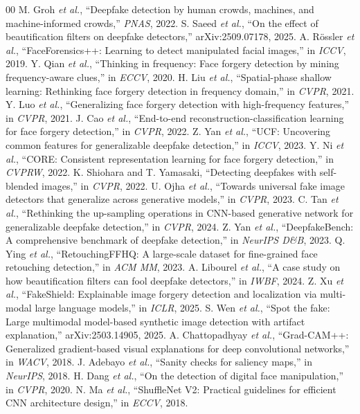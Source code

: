 \documentclass[conference]{IEEEtran}
\begin{document}
\begin{thebibliography}{00}
 M. Groh \emph{et al.}, ``Deepfake detection by human crowds, machines,
and machine-informed crowds,'' \emph{PNAS}, 2022.
 S. Saeed \emph{et al.}, ``On the effect of beautification filters on
deepfake detectors,'' arXiv:2509.07178, 2025.
 A. R\"ossler \emph{et al.}, ``FaceForensics++: Learning to detect
manipulated facial images,'' in \emph{ICCV}, 2019.
 Y. Qian \emph{et al.}, ``Thinking in frequency: Face forgery detection by
mining frequency-aware clues,'' in \emph{ECCV}, 2020.
 H. Liu \emph{et al.}, ``Spatial-phase shallow learning: Rethinking face
forgery detection in frequency domain,'' in \emph{CVPR}, 2021.
 Y. Luo \emph{et al.}, ``Generalizing face forgery detection with
high-frequency features,'' in \emph{CVPR}, 2021.
 J. Cao \emph{et al.}, ``End-to-end reconstruction-classification learning
for face forgery detection,'' in \emph{CVPR}, 2022.
 Z. Yan \emph{et al.}, ``UCF: Uncovering common features for
generalizable deepfake detection,'' in \emph{ICCV}, 2023.
 Y. Ni \emph{et al.}, ``CORE: Consistent representation learning for face
forgery detection,'' in \emph{CVPRW}, 2022.
 K. Shiohara and T. Yamasaki, ``Detecting deepfakes with self-blended
images,'' in \emph{CVPR}, 2022.
 U. Ojha \emph{et al.}, ``Towards universal fake image detectors that
generalize across generative models,'' in \emph{CVPR}, 2023.
 C. Tan \emph{et al.}, ``Rethinking the up-sampling operations in CNN-based
generative network for generalizable deepfake detection,'' in \emph{CVPR}, 2024.
 Z. Yan \emph{et al.}, ``DeepfakeBench: A comprehensive benchmark of
deepfake detection,'' in \emph{NeurIPS D\&B}, 2023.
 Q. Ying \emph{et al.}, ``RetouchingFFHQ: A large-scale dataset for
fine-grained face retouching detection,'' in \emph{ACM MM}, 2023.
 A. Libourel \emph{et al.}, ``A case study on how beautification
filters can fool deepfake detectors,'' in \emph{IWBF}, 2024.
 Z. Xu \emph{et al.}, ``FakeShield: Explainable image forgery detection and
localization via multi-modal large language models,'' in \emph{ICLR}, 2025.
 S. Wen \emph{et al.}, ``Spot the fake: Large multimodal model-based
synthetic image detection with artifact explanation,'' arXiv:2503.14905, 2025.
 A. Chattopadhyay \emph{et al.}, ``Grad-CAM++: Generalized
gradient-based visual explanations for deep convolutional networks,'' in \emph{WACV}, 2018.
 J. Adebayo \emph{et al.}, ``Sanity checks for saliency maps,'' in
\emph{NeurIPS}, 2018.
 H. Dang \emph{et al.}, ``On the detection of digital face manipulation,''
in \emph{CVPR}, 2020.
 N. Ma \emph{et al.}, ``ShuffleNet V2: Practical guidelines for efficient
CNN architecture design,'' in \emph{ECCV}, 2018.
\end{thebibliography}
\end{document}
